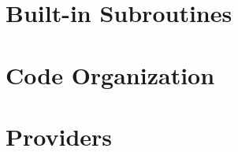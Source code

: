 \chapter{Built-in Subroutines}
\label{chap:opendtrace-subroutines}


\begin{appendices}
\chapter{Code Organization}
\label{chap:opendtrace-code}


\chapter{Providers}
\label{chap:opendtrace-providers}


\end{appendices}






